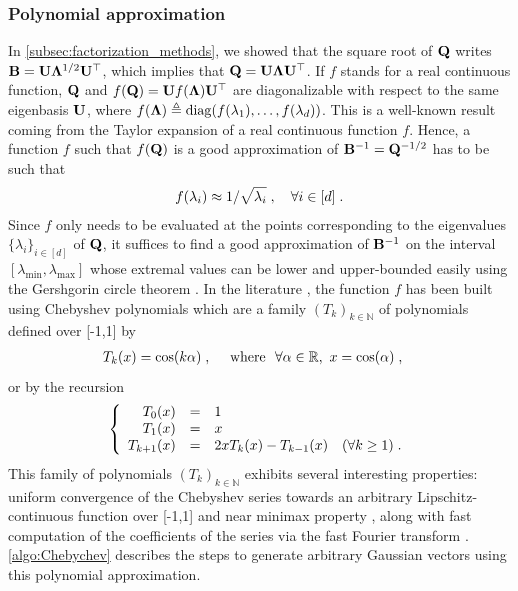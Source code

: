 \documentclass[nohypdvips,onefignum,onetabnum]{siamart171218}
\begin{document}
\subsubsection{Polynomial approximation}
In \cref{subsec:factorization_methods}, we showed that the square root of $\mathbf{Q}$ writes $\mathbf{B} = \mathbf{U}\mathbf{\Lambda}^{1/2}\mathbf{U^{\top}}$, which implies that $\mathbf{Q} = \mathbf{U}\mathbf{\Lambda}\mathbf{U^{\top}}$.
If $f$ stands for a real continuous function, $\mathbf{Q}$ and $f(\mathbf{Q}) = \mathbf{U}f(\mathbf{\Lambda})\mathbf{U}^{\top}$ are diagonalizable with respect to the same eigenbasis $\mathbf{U}$, where $f(\mathbf{\Lambda}) \triangleq \mathrm{diag}(f(\lambda_1),\hdots,f(\lambda_d))$. This is a well-known result coming from the Taylor expansion of a real continuous function $f$.
Hence, a function $f$ such that $f(\mathbf{Q})$ is a good approximation of $\mathbf{B}^{-1} = \mathbf{Q}^{-1/2}$ has to be such that 
\begin{align*}
  f(\lambda_i) \approx 1/\sqrt{\lambda_i}\;, \quad \forall i \in [d]\;.
\end{align*}
Since $f$ only needs to be evaluated at the points corresponding to the eigenvalues $\{\lambda_{i}\}_{i\in[d]}$ of $\mathbf{Q}$, it suffices to find a good approximation of $\mathbf{B}^{-1}$ on the interval $[\lambda_{\min},\lambda_{\max}]$ whose extremal values can be lower and upper-bounded easily using the Gershgorin circle theorem \cite[Theorem 7.2.1]{Golub1989}. 
In the literature \cite{Davis1987b,Ilic2004,Pereira2019}, the function $f$ has been built using Chebyshev polynomials \cite{Mason2002} which are a family $(T_k)_{k \in \mathbb{N}}$ of polynomials defined over [-1,1] by 
\begin{align*}
  &T_k(x) = \cos(k\alpha)\;, \quad \text{ where }\ \forall \alpha \in \mathbb{R},\  x = \cos(\alpha)\;,
\end{align*}
or by the recursion
\begin{equation}
\label{eq:cheby}
\left\{
 \begin{array}{rcl}
     T_0(x) &=& 1  \\
     T_1(x) &=& x \\
     T_{k+1}(x) &=& 2xT_k(x) - T_{k-1}(x) \quad (\forall k \geq 1)\eqsp.
 \end{array}
\right.
\end{equation}
This family of polynomials $(T_k)_{k \in \mathbb{N}}$ exhibits several interesting properties: uniform convergence of the Chebyshev series towards an arbitrary Lipschitz-continuous function over [-1,1] and near minimax property \cite{Mason2002}, along with fast computation of the coefficients of the series via the fast Fourier transform \cite{Press2007}. 
\cref{algo:Chebychev} describes the steps to generate arbitrary Gaussian vectors using this polynomial approximation.
\end{document}
